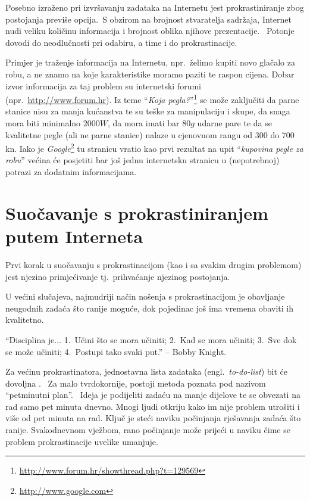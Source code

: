 \documentclass[11pt,twocolumn,english]{article}
\newcommand{\engl}[1]{(engl.~\emph{#1})}
\begin{document}
Posebno izraženo pri izvršavanju zadataka na Internetu jest prokrastiniranje zbog 
postojanja previše opcija.~S obzirom na brojnost stvaratelja sadržaja, Internet
nudi veliku količinu informacija i brojnost oblika njihove prezentacije.~ Potonje dovodi 
do neodlučnosti pri odabiru, a time i do prokrastinacije.

Primjer je traženje informacija na Internetu, npr.~želimo kupiti novo glačalo
za robu, a ne znamo na koje karakteristike moramo paziti te raspon cijena. 
Dobar izvor informacija za taj problem su internetski forumi
(npr.~\url{http://www.forum.hr}). Iz teme ``\emph{Koja pegla?}''\footnote{\url{http://www.forum.hr/showthread.php?t=129569}}
se može zaključiti da parne stanice nisu za manja kućanstva te su teške za
manipulaciju i skupe, da snaga mora biti minimalno $2000 W$, da mora
imati bar $80 g$ udarne pare te da se kvalitetne pegle (ali ne parne stanice)
nalaze u cjenovnom rangu od 300 do 700 kn. Iako je
\emph{Google}\footnote{\url{http://www.google.com}} tu stranicu vratio kao prvi
rezultat na upit ``\emph{kupovina pegle za robu}'' većina će posjetiti bar još
jednu internetsku stranicu u (nepotrebnoj) potrazi za dodatnim informacijama.

\section{Suočavanje s prokrastiniranjem putem Interneta}

Prvi korak u suočavanju s prokrastinacijom (kao i sa svakim drugim problemom)
jest njezino primjećivanje tj.~prihvaćanje njezinog postojanja. 

U većini slučajeva, najmudriji način nošenja s prokrastinacijom je obavljanje
neugodnih zadaća što ranije moguće, dok pojedinac još ima vremena obaviti ih kvalitetno.

``Disciplina je... 1.~Učini što se mora učiniti; 2.~Kad se mora učiniti; 3.~Sve
dok se može učiniti; 4.~Postupi tako svaki put.'' -- Bobby Knight.  

Za većinu prokrastinatora, jednostavna lista zadataka \engl{to-do-list}
bit će dovoljna \cite{TuckerPsySelfHelp}.~ Za malo tvrdokornije, postoji metoda
poznata pod nazivom ``petminutni plan''.~ Ideja je podijeliti zadaću na manje
dijelove te se obvezati na rad samo pet minuta dnevno. Mnogi ljudi otkriju kako
im nije problem utrošiti i više od pet minuta na rad. Ključ je steći naviku
počinjanja rješavanja zadaća što ranije. Svakodnevnom vježbom, rano počinjanje
može prijeći u naviku čime se problem prokrastinacije uvelike umanjuje.
\end{document}

